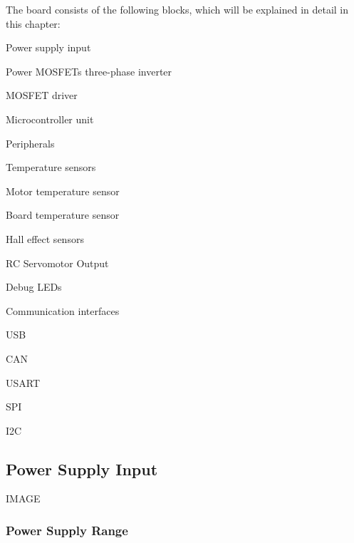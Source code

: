 The board consists of the following blocks, which will be explained in detail in this chapter:
\begin {enumerate}
	\item Power supply input
	\item Power MOSFETs three-phase inverter
	\item MOSFET driver
	\item Microcontroller unit
	\item Peripherals
		\item Hall effect sensors
		\item RC Servomotor Output
		\item Debug LEDs
	\end {aenumerate}
	\item Communication interfaces
	\begin {aenumerate}
		\item USB
		\item CAN
		\item USART
		\item SPI
		\item I2C
	\end {aenumerate}
\end {enumerate}

\subsection{Power Supply Input}

IMAGE\\

\subsubsection{Power Supply Range}

